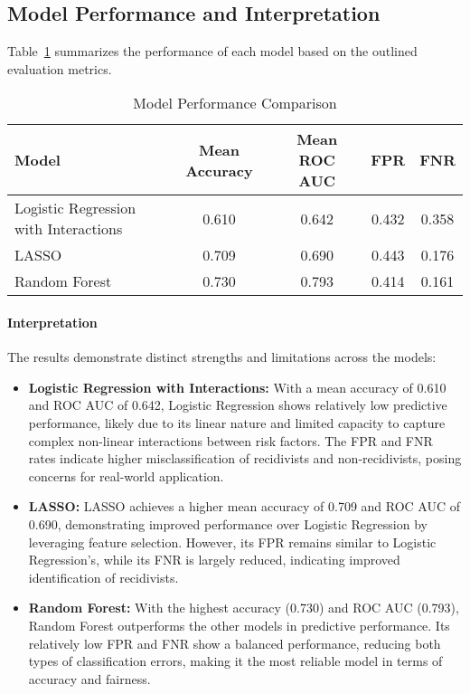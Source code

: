 \documentclass[12pt]{article}
\begin{document}
\subsection{Model Performance and Interpretation}
Table~\ref{tab:model_performance} summarizes the performance of each model based on the outlined evaluation metrics.

\begin{table}[h!]
    \centering
    \caption{Model Performance Comparison}
    \begin{tabular}{lcccc}
        \toprule
        Model & Mean Accuracy & Mean ROC AUC & FPR & FNR \\
        \midrule
        Logistic Regression with Interactions & 0.610 & 0.642 & 0.432 & 0.358 \\
        LASSO & 0.709 & 0.690 & 0.443 & 0.176 \\
        Random Forest & 0.730 & 0.793 & 0.414 & 0.161 \\
        \bottomrule
    \end{tabular}
    \label{tab:model_performance}
\end{table}

\paragraph{Interpretation}
The results demonstrate distinct strengths and limitations across the models:
\begin{itemize}
    \item \textbf{Logistic Regression with Interactions:} With a mean accuracy of 0.610 and ROC AUC of 0.642, Logistic Regression shows relatively low predictive performance, likely due to its linear nature and limited capacity to capture complex non-linear interactions between risk factors. The FPR and FNR rates indicate higher misclassification of recidivists and non-recidivists, posing concerns for real-world application.
    \item \textbf{LASSO:} LASSO achieves a higher mean accuracy of 0.709 and ROC AUC of 0.690, demonstrating improved performance over Logistic Regression by leveraging feature selection. However, its FPR remains similar to Logistic Regression’s, while its FNR is largely reduced, indicating improved identification of recidivists.
    \item \textbf{Random Forest:} With the highest accuracy (0.730) and ROC AUC (0.793), Random Forest outperforms the other models in predictive performance. Its relatively low FPR and FNR show a balanced performance, reducing both types of classification errors, making it the most reliable model in terms of accuracy and fairness.
\end{itemize}
\end{document}
